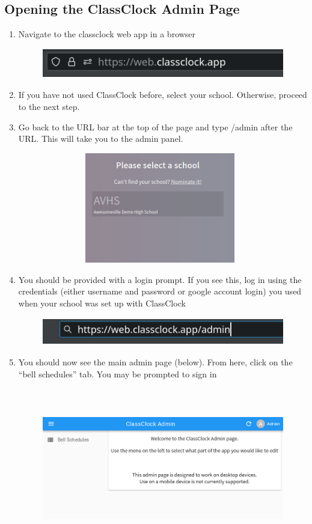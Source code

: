 \documentclass{article}
\begin{document}
\subsection{Opening the ClassClock Admin Page}
\begin{enumerate}
\item {Navigate to the classclock web app in a browser}
\begin{figure}
\includegraphics[width=4.4055in,height=0.5102in]{Mini20Manual-img007.png}\end{figure}
\item {If you have not used ClassClock before, select your school. Otherwise, proceed to the next step.}
\item {Go back to the URL bar at the top of the page and type /admin after the URL. This will take you to the admin panel.}
\begin{figure}
\includegraphics[width=4.0744in,height=1.9016in]{Mini20Manual-img008.png}\end{figure}
\item {You should be provided with a login prompt. If you see this, log in using the credentials (either username and password
or google account login) you used when your school was set up with ClassClock}
\begin{figure}
\includegraphics[width=4.6866in,height=0.4783in]{Mini20Manual-img009.png}\end{figure}
\item {You should now see the main admin page (below). From here, click on the “bell schedules” tab. You may be prompted to
sign in}
\begin{figure}
\includegraphics[width=6.5in,height=2.7626in]{Mini20Manual-img004.png}\end{figure}

\end{enumerate}
\end{document}
